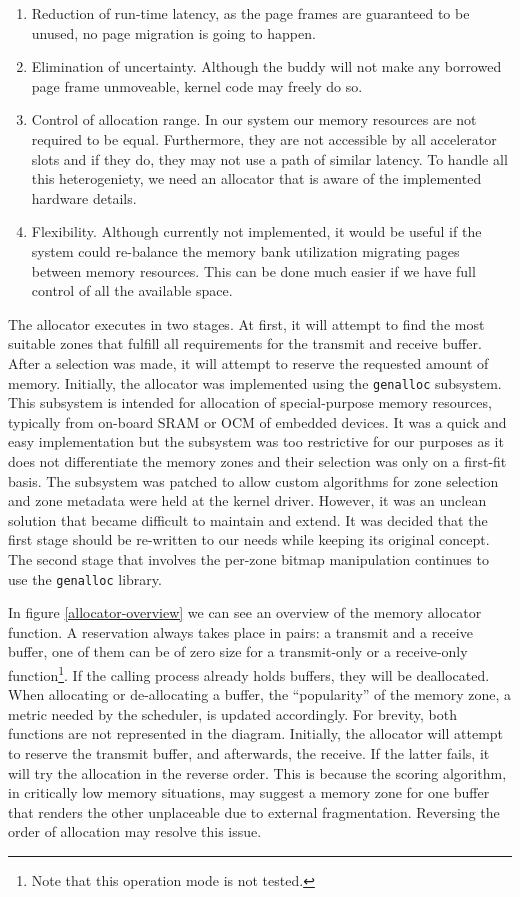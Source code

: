\begin{enumerate}
\item	Reduction of run-time latency, as the page frames are guaranteed to be unused,
	no page migration is going to happen.
\item	Elimination of uncertainty. Although the \gls{buddy} will not make any
	borrowed page frame unmoveable, kernel code may freely do so.
\item	Control of allocation range. In our system our memory resources are not
	required to be equal. Furthermore, they are not accessible by all 
	accelerator slots and if they do, they may not use a path of similar latency.
	To handle all this heterogeniety, we need an allocator that is aware
	of the implemented hardware details.
\item	Flexibility. Although currently not implemented, it would be useful if
	the system could re-balance the memory bank utilization migrating pages
	between memory resources. This can be done much easier if we have full
	control of all the available space.
\end{enumerate}

The allocator executes in two stages. At first, it will attempt to find the most suitable zones that
fulfill all requirements for the transmit and receive buffer. After a selection was made, it will
attempt to reserve the requested amount of memory. Initially, the allocator was implemented
using the \texttt{genalloc} subsystem. This subsystem is intended for allocation of special-purpose
memory resources, typically from on-board SRAM or OCM of embedded devices. 
It was a quick and easy implementation but the subsystem was too restrictive for our purposes as
it does not differentiate the memory zones and their selection was only on a first-fit basis.
The subsystem was patched to allow custom algorithms for zone selection and zone metadata were held
at the kernel driver. However, it was an unclean solution that became difficult to maintain and extend.
It was decided that the first stage should be re-written to our needs while keeping its original concept.
The second stage that involves the per-zone bitmap manipulation continues to use the \texttt{genalloc}
library.

In figure \ref{allocator-overview} we can see an overview of the memory allocator function.
A reservation always takes place in pairs: a transmit and a receive buffer, one of them can be of zero size
for a transmit-only or a receive-only function\footnote{Note that this operation mode is not tested.}.
If the calling process already holds buffers, they will be deallocated. When allocating or de-allocating
a buffer, the ``popularity'' of the memory zone, a metric needed by the scheduler, is updated accordingly.
For brevity, both functions are not represented in the diagram. Initially, the allocator will attempt
to reserve the transmit buffer, and afterwards, the receive. If the latter fails, it will try the allocation
in the reverse order. This is because the scoring algorithm, in critically low memory situations, may suggest a
memory zone for one buffer that renders the other unplaceable due to external fragmentation. Reversing the order
of allocation may resolve this issue.

